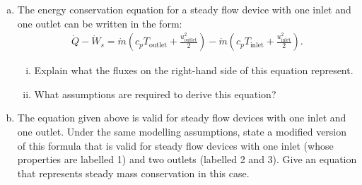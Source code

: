 \documentclass[calculator,steamtables,refrigeranttables,psychrometricchart,datasheet,solutions]{exam}
\begin{document}
\begin{question}
\begin{enumerate}[(a)]
\end{enumerate}

%
\end{question}

\clearpage


\begin{question} 
\begin{enumerate}[(a)]
\item The energy conservation equation for a steady flow device with one inlet and one outlet can be written in the form:
\begin{align*}
 \dot{Q}-\dot{W}_{s} = \dot{m} \left(c_p T_\text{outlet} + \frac{u_{\text{outlet}}^2}{2}\right) - \dot{m} \left(c_p T_\text{inlet} + \frac{u_{\text{inlet}}^2}{2}\right).
\end{align*}
\begin{enumerate}[(i)]
\item Explain what the fluxes on the right-hand side of this equation represent. 
\item What assumptions are required to derive this equation? 
\end{enumerate}

\item The equation given above is valid for steady flow devices with one inlet and one outlet. Under the same modelling assumptions, state a modified version of this formula that is valid for steady flow devices with one inlet (whose properties are labelled 1) and two outlets (labelled 2 and 3). Give an equation that represents steady mass conservation in this case. 
\end{enumerate}
\end{question}
\end{document}
